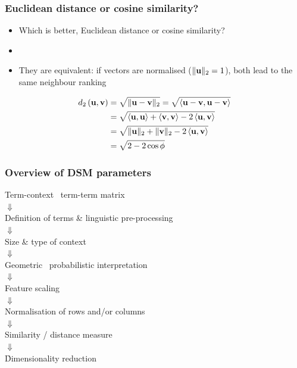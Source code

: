 \documentclass[t]{beamer} %
\begin{document}
\begin{frame}[fragile]
  \frametitle{Euclidean distance or cosine similarity?}

  \begin{itemize}
  \item Which is better, Euclidean distance or cosine similarity?
  \item[]
  \item<2-> They are equivalent: if vectors are normalised ($\norm[2]{\vu} = 1$),
    both lead to the same neighbour ranking
  \end{itemize}

  \begin{align*}
    \dist[2]{\vu}{\vv} 
    &= \sqrt{\norm[2]{\vu - \vv}}
    = \sqrt{\sprod{\vu - \vv}{\vu - \vv}}
    \\
    &= \sqrt{\sprod{\vu}{\vu} + \sprod{\vv}{\vv} - 2 \sprod{\vu}{\vv}}
    \\
    &= \sqrt{\norm[2]{\vu} + \norm[2]{\vv} - 2 \sprod{\vu}{\vv}}
    \\
    &= \sqrt{2 - 2 \cos \phi}
  \end{align*}
\end{frame}

\begin{frame}
  \frametitle{Overview of DSM parameters}

  \ungap[1]
  \begin{center}
    Term-context \vs\ term-term matrix\\
    $\Downarrow$\\
    Definition of terms \& linguistic pre-processing\\
    $\Downarrow$\\
    Size \& type of context\\
    $\Downarrow$\\
    Geometric \vs\ probabilistic interpretation\\
    $\Downarrow$\\
    Feature scaling\\
    $\Downarrow$\\
    Normalisation of rows and/or columns\\
    $\Downarrow$\\
    Similarity / distance measure\\
    $\Downarrow$\\
    \h{Dimensionality reduction}
  \end{center}
\end{frame}
\end{document}
